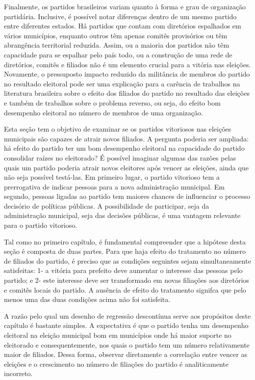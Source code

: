 Finalmente, os partidos brasileiros variam quanto à forma e grau de organização partidária. Inclusive, é possível notar diferenças dentro de um mesmo partido entre diferentes estados. Há partidos que contam com diretórios espalhados em vários municípios, enquanto outros têm apenas comitês provisórios ou têm abrangência territorial reduzida. Assim, ou a maioria dos partidos não têm capacidade para se espalhar pelo país todo, ou a construção de uma rede de diretórios, comitês e filiados não é um elemento crucial para a vitória nas eleições. Novamente, o pressuposto impacto reduzido da militância de membros do partido no resultado eleitoral pode ser uma explicação para a carência de trabalhos na literatura brasileira sobre o efeito dos filiados do partido no resultado das eleições e também de trabalhos sobre o problema reverso, ou seja, do efeito bom desempenho eleitoral no número de membros de uma organização.

Esta seção tem o objetivo de examinar se os partidos vitoriosos nas eleições municipais são capazes de atrair novos filiados. A pergunta poderia ser ampliada: há efeito do partido ter um bom desempenho eleitoral na capacidade do partido consolidar raízes no eleitorado? É possível imaginar algumas das razões pelas quais um partido poderia atrair novos eleitores após vencer as eleições, ainda que não seja possível testá-las. Em primeiro lugar, o partido vitorioso tem a prerrogativa de indicar pessoas para a nova administração municipal. Em segundo, pessoas ligadas ao partido tem maiores chances de influenciar o processo decisório de políticas públicas. A possibilidade de participar, seja da administração municipal, seja das decisões públicas, é uma vantagem relevante para o partido vitorioso.

Tal como no primeiro capítulo, é fundamental compreender que a hipótese desta seção é composta de duas partes. Para que haja efeito do tratamento no número de filiados do partido, é preciso que as condições seguintes sejam simultaneamente satisfeitas: 1- a vitória para prefeito deve aumentar o interesse das pessoas pelo partido; e 2- este interesse deve ser transformado em novas filiações aos diretórios e comitês locais do partido. A ausência de efeito do tratamento signifca que pelo menos uma das duas condições acima não foi satisfeita.

A razão pelo qual um desenho de regressão descontínua serve aos propósitos deste capítulo é bastante simples. A expectativa é que o partido tenha um desempenho eleitoral na eleição municipal bom em municípios onde há maior suporte no eleitorado e consequentemente, nos quais o partido tem um número relativamente maior de filiados. Dessa forma, observar diretamente a correlação entre vencer as eleições e o crescimento no número de filiações do partido é analiticamente incorreto. 

